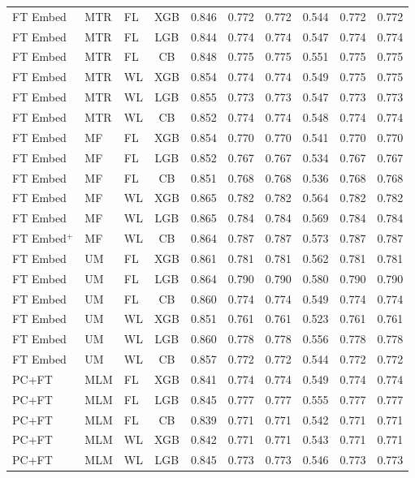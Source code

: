 \documentclass[9pt,a4paper]{article}
\begin{document}
\begin{scriptsize}
\begin{longtable}{lllcrrrrrr}
FT Embed & MTR & FL & XGB & 0.846 & 0.772 & 0.772 & 0.544 & 0.772 & 0.772 \\
FT Embed & MTR & FL & LGB & 0.844 & 0.774 & 0.774 & 0.547 & 0.774 & 0.774 \\
FT Embed & MTR & FL & CB  & 0.848 & 0.775 & 0.775 & 0.551 & 0.775 & 0.775 \\
FT Embed & MTR & WL & XGB & 0.854 & 0.774 & 0.774 & 0.549 & 0.775 & 0.775 \\
FT Embed & MTR & WL & LGB & 0.855 & 0.773 & 0.773 & 0.547 & 0.773 & 0.773 \\
FT Embed & MTR & WL & CB  & 0.852 & 0.774 & 0.774 & 0.548 & 0.774 & 0.774 \\
FT Embed & MF  & FL & XGB & 0.854 & 0.770 & 0.770 & 0.541 & 0.770 & 0.770 \\
FT Embed & MF  & FL & LGB & 0.852 & 0.767 & 0.767 & 0.534 & 0.767 & 0.767 \\
FT Embed & MF  & FL & CB  & 0.851 & 0.768 & 0.768 & 0.536 & 0.768 & 0.768 \\
FT Embed & MF  & WL & XGB & 0.865 & 0.782 & 0.782 & 0.564 & 0.782 & 0.782 \\
FT Embed & MF  & WL & LGB & 0.865 & 0.784 & 0.784 & 0.569 & 0.784 & 0.784 \\
FT Embed$^+$ & MF & WL & CB & 0.864 & 0.787 & 0.787 & 0.573 & 0.787 & 0.787 \\
FT Embed & UM  & FL & XGB & 0.861 & 0.781 & 0.781 & 0.562 & 0.781 & 0.781 \\
FT Embed & UM  & FL & LGB & 0.864 & 0.790 & 0.790 & 0.580 & 0.790 & 0.790 \\
FT Embed & UM  & FL & CB  & 0.860 & 0.774 & 0.774 & 0.549 & 0.774 & 0.774 \\
FT Embed & UM  & WL & XGB & 0.851 & 0.761 & 0.761 & 0.523 & 0.761 & 0.761 \\
FT Embed & UM  & WL & LGB & 0.860 & 0.778 & 0.778 & 0.556 & 0.778 & 0.778 \\
FT Embed & UM  & WL & CB  & 0.857 & 0.772 & 0.772 & 0.544 & 0.772 & 0.772 \\
\midrule
PC+FT & MLM & FL & XGB & 0.841 & 0.774 & 0.774 & 0.549 & 0.774 & 0.774 \\
PC+FT & MLM & FL & LGB & 0.845 & 0.777 & 0.777 & 0.555 & 0.777 & 0.777 \\
PC+FT & MLM & FL & CB  & 0.839 & 0.771 & 0.771 & 0.542 & 0.771 & 0.771 \\
PC+FT & MLM & WL & XGB & 0.842 & 0.771 & 0.771 & 0.543 & 0.771 & 0.771 \\
PC+FT & MLM & WL & LGB & 0.845 & 0.773 & 0.773 & 0.546 & 0.773 & 0.773 \\

\end{longtable}
\end{scriptsize}
\end{document}
